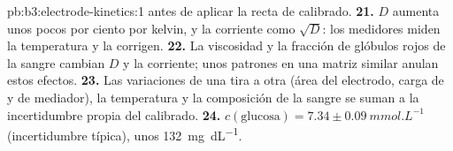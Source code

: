 \begin{solution}{pb:b3:electrode-kinetics:1}
antes de aplicar la recta de calibrado.
\textbf{21.} $D$ aumenta unos pocos por ciento por kelvin, y la corriente como $\sqrt D$: los medidores miden
la temperatura y la corrigen.
\textbf{22.} La viscosidad y la fracción de glóbulos rojos de la sangre cambian $D$ y la corriente;
unos patrones en una matriz similar anulan estos efectos.
\textbf{23.} Las variaciones de una tira a otra (área del electrodo, carga de  y de mediador),
la temperatura y la composición de la sangre se suman a la incertidumbre propia del calibrado.
\textbf{24.} \textbf{$c(\text{glucosa}) = 7.34 \pm \qty{0.09}{mmol.L^{-1}}$} (incertidumbre típica), unos \qty{132}{mg.dL^{-1}}.
\end{solution}
